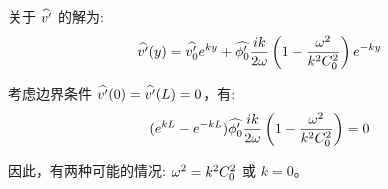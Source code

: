 关于 $\widehat{v^\prime}$ 的解为:
\begin{equation}
    \widehat{v^\prime}(y) = \widehat{v_0^\prime} e^{k y} + \widehat{\phi_0^\prime} \frac{i k}{2\omega} \left(1 - \frac{\omega^2}{k^2 C_0^2}\right) e^{-k y}
    \label{eq:v_solution_oscillation}
\end{equation}

考虑边界条件 $\widehat{v^\prime}(0) = \widehat{v^\prime}(L) = 0$，有:
\begin{equation*}
    (e^{k L} - e^{-k L}) \widehat{\phi_0^\prime} \frac{i k}{2\omega} \left(1 - \frac{\omega^2}{k^2 C_0^2}\right) = 0
\end{equation*}

因此，有两种可能的情况: $\omega^2 = k^2 C_0^2$ 或 $k = 0$。
